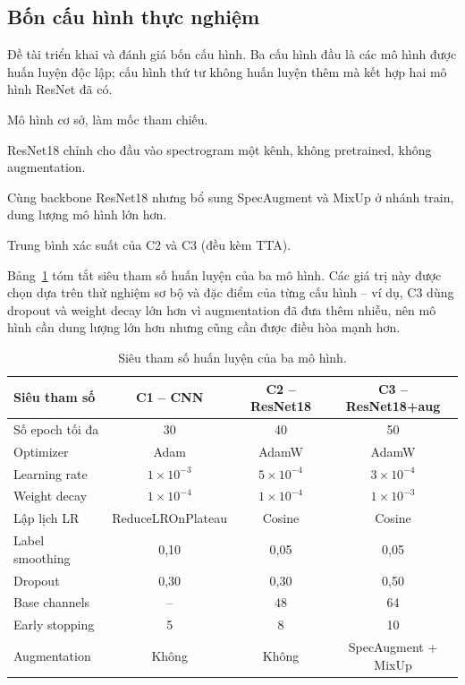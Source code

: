 \subsection{Bốn cấu hình thực nghiệm}

Đề tài triển khai và đánh giá bốn cấu hình. Ba cấu hình đầu là các mô hình được
huấn luyện độc lập; cấu hình thứ tư không huấn luyện thêm mà kết hợp hai mô hình
ResNet đã có.

\begin{description}[leftmargin=2.0em,itemsep=3pt]
  \item[\textbf{C1 -- CNN baseline.}] Mô hình cơ sở, làm mốc tham chiếu.
  \item[\textbf{C2 -- ResNet18.}] ResNet18 chỉnh cho đầu vào spectrogram một
        kênh, không pretrained, không augmentation.
  \item[\textbf{C3 -- ResNet18 + augmentation.}] Cùng backbone ResNet18 nhưng bổ
        sung SpecAugment và MixUp ở nhánh train, dung lượng mô hình lớn hơn.
  \item[\textbf{C4 -- Ensemble.}] Trung bình xác suất của C2 và C3 (đều kèm TTA).
\end{description}

Bảng~\ref{tab:config} tóm tắt siêu tham số huấn luyện của ba mô hình. Các giá trị
này được chọn dựa trên thử nghiệm sơ bộ và đặc điểm của từng cấu hình -- ví dụ,
C3 dùng dropout và weight decay lớn hơn vì augmentation đã đưa thêm nhiễu, nên mô
hình cần dung lượng lớn hơn nhưng cũng cần được điều hòa mạnh hơn.

\begin{table}[H]
\centering
\caption{Siêu tham số huấn luyện của ba mô hình.}
\label{tab:config}
\small
\begin{tabular}{lccc}
\toprule
\textbf{Siêu tham số} & \textbf{C1 -- CNN} & \textbf{C2 -- ResNet18} & \textbf{C3 -- ResNet18+aug}\\
\midrule
Số epoch tối đa      & 30                & 40                 & 50\\
Optimizer            & Adam              & AdamW              & AdamW\\
Learning rate        & $1\!\times\!10^{-3}$ & $5\!\times\!10^{-4}$ & $3\!\times\!10^{-4}$\\
Weight decay         & $1\!\times\!10^{-4}$ & $1\!\times\!10^{-4}$ & $1\!\times\!10^{-3}$\\
Lập lịch LR          & ReduceLROnPlateau & Cosine             & Cosine\\
Label smoothing      & 0{,}10            & 0{,}05             & 0{,}05\\
Dropout              & 0{,}30            & 0{,}30             & 0{,}50\\
Base channels        & --                & 48                 & 64\\
Early stopping       & 5                 & 8                  & 10\\
Augmentation         & Không             & Không              & SpecAugment + MixUp\\
\bottomrule
\end{tabular}
\end{table}

